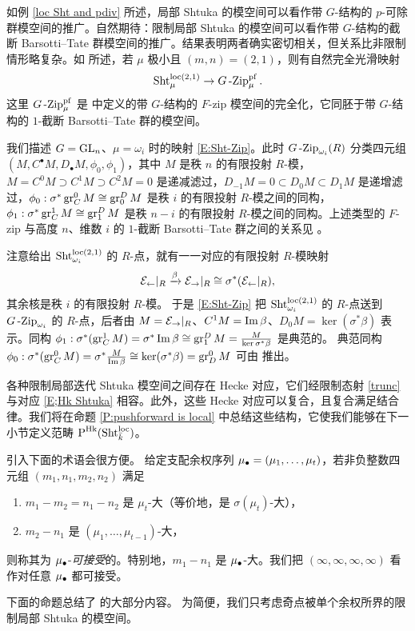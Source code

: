 \begin{rmk}
\label{Ex:Sht and GZip}
如例 \ref{loc Sht and pdiv} 所述，局部 Shtuka 的模空间可以看作带 $G$-结构的 $p$-可除群模空间的推广。自然期待：限制局部 Shtuka 的模空间可以看作带 $G$-结构的截断 Barsotti–Tate 群模空间的推广。结果表明两者确实密切相关，但关系比非限制情形略复杂。如 \cite[引理 5.3.6]{XZ} 所述，若 $\mu$ 极小且 $(m,n)=(2,1)$，则有自然完全光滑映射
\begin{equation}
\label{E:Sht-Zip}
\operatorname{Sht}_\mu^{\mathrm{loc}(2,1)}\to G\operatorname{-Zip}^{\operatorname{pf}}_\mu.
\end{equation}
这里 $G\operatorname{-Zip}^{\operatorname{pf}}_\mu$ 是 \cite{PWZ} 中定义的带 $G$-结构的 $F$-zip 模空间的完全化，它同胚于带 $G$-结构的 $1$-截断 Barsotti–Tate 群的模空间。

我们描述 $G={\operatorname{GL}}_n$、$\mu=\omega_i$ 时的映射 \eqref{E:Sht-Zip}。此时 $G\operatorname{-Zip}_{\omega_i}(R)$ 分类四元组 $(M, C^\bullet M, D_\bullet M, \phi_0,\phi_1)$，其中 $M$ 是秩 $n$ 的有限投射 $R$-模，$M=C^0M\supset C^1M\supset C^2M=0$ 是递减滤过，$D_{-1}M=0\subset D_0M\subset D_1M$ 是递增滤过，$\phi_0:\sigma^*\operatorname{gr}_C^0M\cong \operatorname{gr}_0^DM$ 是秩 $i$ 的有限投射 $R$-模之间的同构，$\phi_1: \sigma^*\operatorname{gr}_C^1M\cong \operatorname{gr}_1^DM$ 是秩 $n-i$ 的有限投射 $R$-模之间的同构。上述类型的 $F$-zip 与高度 $n$、维数 $i$ 的 $1$-截断 Barsotti–Tate 群之间的关系见 \cite[\S 9.3]{PWZ}。

注意给出 $\operatorname{Sht}_{\omega_i}^{\mathrm{loc}(2,1)}$ 的 $R$-点，就有一一对应的有限投射 $R$-模映射
$${\mathcal E}_\leftarrow|_{R}\xrightarrow{\beta} {\mathcal E}_\to|_{R}\cong \sigma^*({\mathcal E}_\leftarrow|_{R}),$$ 其余核是秩 $i$ 的有限投射 $R$-模。
于是 \eqref{E:Sht-Zip} 把 $\operatorname{Sht}_{\omega_i}^{\mathrm{loc}(2,1)}$ 的 $R$-点送到 $G\operatorname{-Zip}_{\omega_i}$ 的 $R$-点，后者由 $M={\mathcal E}_\to|_{R}$、$C^1M=\operatorname{Im} \beta$、$D_0M=\ker(\sigma^*\beta)$ 表示。同构 $\phi_1: \sigma^*(\operatorname{gr}_C^1M)=\sigma^*\operatorname{Im}\beta\cong \operatorname{gr}^D_1M=\frac{M}{\ker\sigma^*\beta}$ 是典范的。
典范同构 $\phi_0: \sigma^*(\operatorname{gr}_C^0M)=\sigma^*\frac{M}{\operatorname{Im}\beta}\cong \ker(\sigma^*\beta)=\operatorname{gr}^0_DM$ 可由 \cite[(1.3.2)]{Zh1} 推出。
\end{rmk}

各种限制局部迭代 Shtuka 模空间之间存在 Hecke 对应，它们经限制态射 \eqref{trunc} 与对应 \eqref{E;Hk Shtuka} 相容。此外，这些 Hecke 对应可以复合，且复合满足结合律。我们将在命题 \ref{P:pushforward is local} 中总结这些结构，它使我们能够在下一小节定义范畴 $\operatorname{P}^{{\operatorname{Hk}}}(\operatorname{Sht}^{\mathrm{loc}}_{\bar k})$。

引入下面的术语会很方便。
给定支配余权序列 ${\mu_\bullet}=(\mu_1,\ldots,\mu_t)$，若非负整数四元组 $(m_1,n_1,m_2,n_2)$ 满足
\begin{enumerate}
\item
$m_1-m_2=n_1-n_2$ 是 $\mu_t$-大（等价地，是 $\sigma(\mu_t)$-大），
\item
$m_2-n_1$ 是 $(\mu_1, \dots, \mu_{t-1})$-大，
\end{enumerate}
则称其为 ${\mu_\bullet}$-\emph{可接受}的。特别地，$m_1-n_1$ 是 ${\mu_\bullet}$-大。我们把 $(\infty,\infty,\infty,\infty)$ 看作对任意 ${\mu_\bullet}$ 都可接受。

下面的命题总结了 \cite[\S 5.3]{XZ} 的大部分内容。
为简便，我们只考虑奇点被单个余权所界的限制局部 Shtuka 的模空间。
